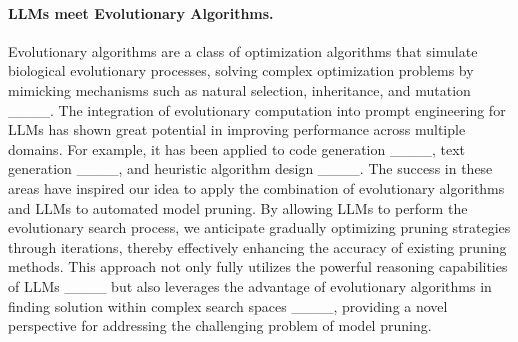\paragraph{LLMs meet Evolutionary Algorithms.}
Evolutionary algorithms are a class of optimization algorithms that simulate biological evolutionary processes, solving complex optimization problems by mimicking mechanisms such as natural selection, inheritance, and mutation ____. The integration of evolutionary computation into prompt engineering for LLMs has shown great potential in improving performance across multiple domains. For example, it has been applied to code generation ____, text generation ____, and heuristic algorithm design ____. The success in these areas have inspired our idea to apply the combination of evolutionary algorithms and LLMs to automated model pruning. By allowing LLMs to perform the evolutionary search process, we anticipate gradually optimizing pruning strategies through iterations, thereby effectively enhancing the accuracy of existing pruning methods. This approach not only fully utilizes the powerful reasoning capabilities of LLMs ____ but also leverages the advantage of evolutionary algorithms in finding solution within complex search spaces ____, providing a novel perspective for addressing the challenging problem of model pruning.